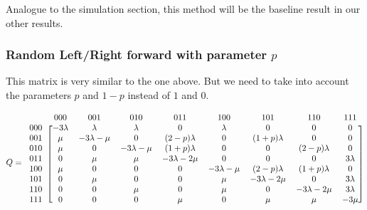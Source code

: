 \documentclass[10pt,a4paper]{article}
\begin{document}
Analogue to the simulation section, this method will be the baseline result in our other results.

\subsubsection*{Random Left/Right forward with parameter $p$}
This matrix is very similar to the one above. But we need to take into account the parameters $p$ and $1-p$ instead of $1$ and $0$.

\[ Q =
  \begin{blockarray}{ccccccccc}
    & 000 & 001 & 010 & 011 & 100 & 101 & 110 & 111 \\
    \begin{block}{c[cccccccc]}
    000 & -3 \lambda & \lambda & \lambda & 0 & \lambda & 0 & 0 & 0 \\
    001 & \mu & -3\lambda-\mu & 0 & (2-p)\lambda & 0 & (1+p)\lambda & 0 & 0 \\
    010 & \mu & 0 & -3\lambda-\mu & (1+p)\lambda & 0 & 0 & (2-p)\lambda & 0 \\
    011 & 0 & \mu & \mu & -3\lambda-2\mu & 0 & 0 & 0 & 3\lambda \\
    100 & \mu & 0 & 0 & 0 & -3\lambda-\mu & (2-p)\lambda & (1+p)\lambda & 0 \\
    101 & 0 & \mu & 0 & 0 & \mu & -3\lambda-2\mu & 0 & 3\lambda \\
    110 & 0 & 0 & \mu & 0 & \mu & 0 & -3\lambda-2\mu & 3\lambda \\
    111 & 0 & 0 & 0 & \mu & 0 & \mu & \mu & -3\mu \\
    \end{block}
  \end{blockarray}
\]
\end{document}
